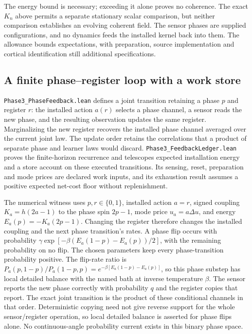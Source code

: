 \documentclass{article}
\begin{document}
The energy bound is necessary; exceeding it alone proves no coherence.
The exact $K_n$ above permits a separate stationary scalar comparison, but
neither comparison establishes an evolving coherent field. The sensor phases
are supplied configurations, and no dynamics feeds the installed kernel back
into them. The allowance bounds expectations, with preparation, source
implementation and cortical identification still additional specifications.

\subsection{A finite phase--register loop with a work store}

\nolinkurl{Phase3_PhaseFeedback.lean} defines a joint transition retaining a
phase $p$ and register $r$: the installed action $a(r)$ selects a phase
channel, a sensor reads the new phase, and the resulting observation updates
the same register. Marginalizing the new register recovers the installed phase
channel averaged over the current joint law. The update order retains the
correlations that a product of separate phase and learner laws would discard.
\nolinkurl{Phase3_FeedbackLedger.lean} proves the finite-horizon recurrence
and telescopes expected installation energy and a store account on these
executed transitions. Its sensing, reset, preparation and mode prices are
declared work inputs, and its exhaustion result assumes a positive expected
net-cost floor without replenishment.

The numerical witness uses $p,r\in\{0,1\}$, installed action $a=r$,
signed coupling $K_a=h(2a-1)$ to the phase spin $2p-1$, mode price
$u_a=a\Delta u$, and energy $E_a(p)=-K_a(2p-1)$. Changing the register
therefore changes the installed coupling and the next phase transition's
rates. A phase flip occurs with probability
$\gamma\exp[-\beta(E_a(1-p)-E_a(p))/2]$, with the remaining probability on
no flip. The chosen parameters keep every phase-transition probability
positive. The flip-rate ratio is
$P_a(p,1-p)/P_a(1-p,p)=e^{-\beta[E_a(1-p)-E_a(p)]}$, so this
phase substep has local detailed balance with the named bath at inverse
temperature $\beta$. The sensor reports the new phase correctly with
probability $q$ and the register copies that report. The exact joint
transition is the product of these conditional channels in that order.
Deterministic copying need not give reverse support for the whole
sensor/register operation, so local detailed balance is asserted for phase
flips alone. No continuous-angle probability current exists in this binary
phase space.
\end{document}
